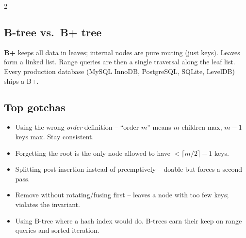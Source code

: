 \documentclass[10pt]{article}
\begin{document}
\begin{multicols}{2}
\subsection*{B-tree vs.\ B+ tree}
\textbf{B+} keeps all data in leaves; internal nodes are pure
routing (just keys). Leaves form a linked list. Range queries are
then a single traversal along the leaf list. Every production
database (MySQL InnoDB, PostgreSQL, SQLite, LevelDB) ships a B+.

\subsection*{Top gotchas}
\begin{itemize}
    \item Using the wrong \emph{order} definition -- ``order $m$''
    means $m$ children max, $m-1$ keys max. Stay consistent.
    \item Forgetting the root is the only node allowed to have
    $< \lceil m/2 \rceil - 1$ keys.
    \item Splitting post-insertion instead of preemptively -- doable
    but forces a second pass.
    \item Remove without rotating/fusing first -- leaves a node with
    too few keys; violates the invariant.
    \item Using B-tree where a hash index would do. B-trees earn
    their keep on range queries and sorted iteration.
\end{itemize}

\end{multicols}
\end{document}
